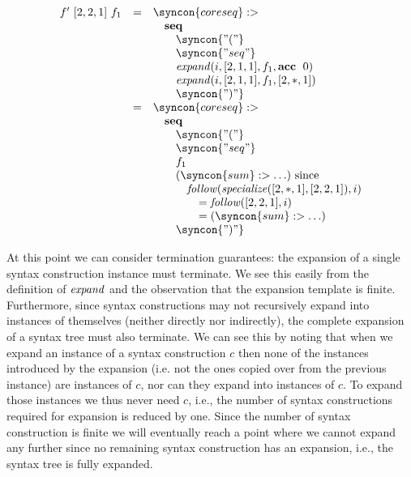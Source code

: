 \documentclass{kththesis}
\begin{document}
$$
\begin{array}{rcl}
f'~[2, 2, 1]~f_1 & = & \syncon{coreseq} :> \\
& & \quad \seq \\
& & \qquad \syncon{"("} \\
& & \qquad \syncon{"seq"} \\
& & \qquad \expand(i, [2, 1, 1], f_1, \acc~0) \\
& & \qquad \expand(i, [2, 1, 1], f_1, [2, *, 1]) \\
& & \qquad \syncon{")"} \\
& = & \syncon{coreseq} :> \\
& & \quad \seq \\
& & \qquad \syncon{"("} \\
& & \qquad \syncon{"seq"} \\
& & \qquad f_1 \\
& & \qquad (\syncon{sum} :> \ldots) \text{ since} \\
& & \qquad \quad \follow(\specialize([2, *, 1], [2, 2, 1]), i) \\
& & \qquad \qquad = \follow([2, 2, 1], i) \\
& & \qquad \qquad = (\syncon{sum} :> \ldots) \\
& & \qquad \syncon{")"} \\
\end{array}
$$

At this point we can consider termination guarantees: the expansion of a single syntax construction instance must terminate. We see this easily from the definition of $\mathit{expand}$ and the observation that the expansion template is finite. Furthermore, since syntax constructions may not recursively expand into instances of themselves (neither directly nor indirectly), the complete expansion of a syntax tree must also terminate. We can see this by noting that when we expand an instance of a syntax construction $c$ then none of the instances introduced by the expansion (i.e. not the ones copied over from the previous instance) are instances of $c$, nor can they expand into instances of $c$. To expand those instances we thus never need $c$, i.e., the number of syntax constructions required for expansion is reduced by one. Since the number of syntax construction is finite we will eventually reach a point where we cannot expand any further since no remaining syntax construction has an expansion, i.e., the syntax tree is fully expanded.
\end{document}
